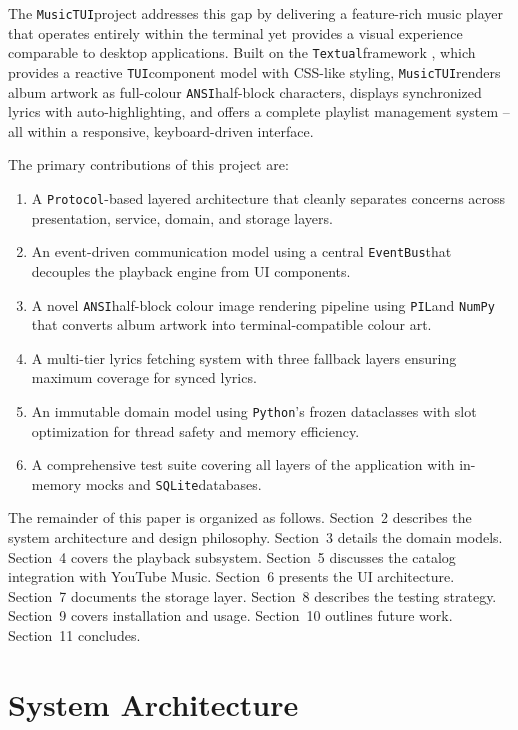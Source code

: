\documentclass[a4paper,11pt,twoside]{article}
\newcommand{\py}{\texttt{Python}}
\newcommand{\textual}{\texttt{Textual}}
\newcommand{\sqlite}{\texttt{SQLite}}
\newcommand{\ansi}{\texttt{ANSI}}
\newcommand{\pil}{\texttt{PIL}}
\newcommand{\tui}{\texttt{TUI}}
\newcommand{\musictui}{\texttt{MusicTUI}}
\newcommand{\eventbus}{\texttt{EventBus}}
\newcommand{\protocol}{\texttt{Protocol}}
\newcommand{\numpy}{\texttt{NumPy}\xspace}
\begin{document}
The \musictui project addresses this gap by delivering a feature-rich music
player that operates entirely within the terminal yet provides a visual
experience comparable to desktop applications. Built on the \textual framework
\cite{textual}, which provides a reactive \tui component model with CSS-like
styling, \musictui renders album artwork as full-colour \ansi half-block
characters, displays synchronized lyrics with auto-highlighting, and offers a
complete playlist management system -- all within a responsive, keyboard-driven
interface.

The primary contributions of this project are:

\begin{enumerate}
    \item A \protocol-based layered architecture that cleanly separates
          concerns across presentation, service, domain, and storage layers.
    \item An event-driven communication model using a central \eventbus that
          decouples the playback engine from UI components.
    \item A novel \ansi half-block colour image rendering pipeline using
          \pil and \numpy that converts album artwork into terminal-compatible
          colour art.
    \item A multi-tier lyrics fetching system with three fallback layers
          ensuring maximum coverage for synced lyrics.
    \item An immutable domain model using \py's frozen dataclasses with
          slot optimization for thread safety and memory efficiency.
    \item A comprehensive test suite covering all layers of the application
          with in-memory mocks and \sqlite databases.
\end{enumerate}

The remainder of this paper is organized as follows. Section~2 describes the
system architecture and design philosophy. Section~3 details the domain models.
Section~4 covers the playback subsystem. Section~5 discusses the catalog
integration with YouTube Music. Section~6 presents the UI architecture.
Section~7 documents the storage layer. Section~8 describes the testing
strategy. Section~9 covers installation and usage. Section~10 outlines future
work. Section~11 concludes.

\newpage

\section{System Architecture}
\end{document}
